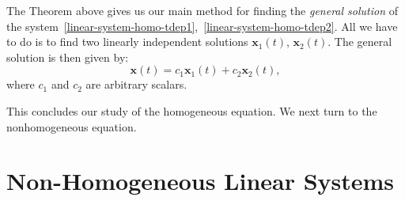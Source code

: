 The Theorem above gives us our main method for finding the \emph{general solution} of the system~\eqref{linear-system-homo-tdep1},~\eqref{linear-system-homo-tdep2}. All we have to do is to find two linearly independent solutions $\mathbf{x}_1(t)$, $\mathbf{x}_2(t)$. The general solution is then given by:
\[
\mathbf{x}(t)=c_1\mathbf{x}_1(t)+c_2\mathbf{x}_2(t),
\]
where $c_1$ and $c_2$ are arbitrary scalars.

This concludes our study of the homogeneous equation. We next turn to the nonhomogeneous equation.

\section{Non-Homogeneous Linear Systems}




































